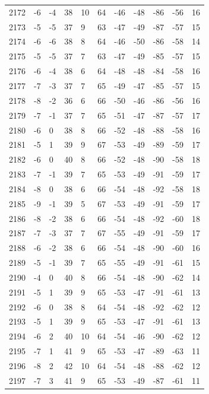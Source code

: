 \begin{table}[H]
\begin{tabular}{lllllllllll}
2172 & -6 & -4 & 38 & 10 & 64 & -46 & -48 & -86 & -56 & 16 \\
2173 & -5 & -5 & 37 & 9 & 63 & -47 & -49 & -87 & -57 & 15 \\
2174 & -6 & -6 & 38 & 8 & 64 & -46 & -50 & -86 & -58 & 14 \\
2175 & -5 & -5 & 37 & 7 & 63 & -47 & -49 & -85 & -57 & 15 \\
2176 & -6 & -4 & 38 & 6 & 64 & -48 & -48 & -84 & -58 & 16 \\
2177 & -7 & -3 & 37 & 7 & 65 & -49 & -47 & -85 & -57 & 15 \\
2178 & -8 & -2 & 36 & 6 & 66 & -50 & -46 & -86 & -56 & 16 \\
2179 & -7 & -1 & 37 & 7 & 65 & -51 & -47 & -87 & -57 & 17 \\
2180 & -6 & 0 & 38 & 8 & 66 & -52 & -48 & -88 & -58 & 16 \\
2181 & -5 & 1 & 39 & 9 & 67 & -53 & -49 & -89 & -59 & 17 \\
2182 & -6 & 0 & 40 & 8 & 66 & -52 & -48 & -90 & -58 & 18 \\
2183 & -7 & -1 & 39 & 7 & 65 & -53 & -49 & -91 & -59 & 17 \\
2184 & -8 & 0 & 38 & 6 & 66 & -54 & -48 & -92 & -58 & 18 \\
2185 & -9 & -1 & 39 & 5 & 67 & -53 & -49 & -91 & -59 & 17 \\
2186 & -8 & -2 & 38 & 6 & 66 & -54 & -48 & -92 & -60 & 18 \\
2187 & -7 & -3 & 37 & 7 & 67 & -55 & -49 & -91 & -59 & 17 \\
2188 & -6 & -2 & 38 & 6 & 66 & -54 & -48 & -90 & -60 & 16 \\
2189 & -5 & -1 & 39 & 7 & 65 & -55 & -49 & -91 & -61 & 15 \\
2190 & -4 & 0 & 40 & 8 & 66 & -54 & -48 & -90 & -62 & 14 \\
2191 & -5 & 1 & 39 & 9 & 65 & -53 & -47 & -91 & -61 & 13 \\
2192 & -6 & 0 & 38 & 8 & 64 & -54 & -48 & -92 & -62 & 12 \\
2193 & -5 & 1 & 39 & 9 & 65 & -53 & -47 & -91 & -61 & 13 \\
2194 & -6 & 2 & 40 & 10 & 64 & -54 & -46 & -90 & -62 & 12 \\
2195 & -7 & 1 & 41 & 9 & 65 & -53 & -47 & -89 & -63 & 11 \\
2196 & -8 & 2 & 42 & 10 & 64 & -54 & -48 & -88 & -62 & 12 \\
2197 & -7 & 3 & 41 & 9 & 65 & -53 & -49 & -87 & -61 & 11 \\

\end{tabular}
\end{table}

